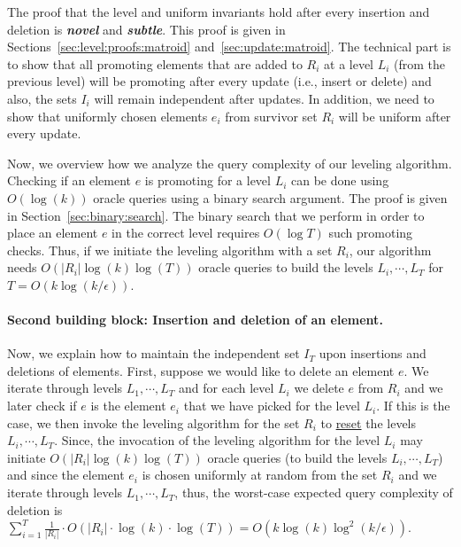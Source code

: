 \documentclass[11pt]{article}
\newcommand{\mO}{O}
\begin{document}
The proof that the level and uniform invariants hold after every insertion and deletion 
is \textbf{\textit{novel}} and \textbf{\textit{subtle}}. 
This proof is given in Sections~\ref{sec:level:proofs:matroid} and~\ref{sec:update:matroid}. 
The technical part is to show that all promoting elements that are added to $R_i$ at a level $L_i$ (from the previous level) 
will be promoting after every update (i.e., insert or delete) and also, the sets $I_i$ will remain independent after updates. 
In addition, we need to show that uniformly chosen elements $e_i$ from survivor set $R_i$ 
will be uniform after every update. 

Now, we overview how we analyze the query complexity of our leveling algorithm.
Checking if an element $e$ is promoting for a level $L_{i}$ 
can be done using $O(\log(k))$ oracle queries using a binary search argument.
The proof is given in Section~\ref{sec:binary:search}.
The binary search that we perform in order to
place an element $e$ in the correct level requires $O(\log T)$ such promoting checks.
Thus, if we initiate the leveling algorithm with a set $R_i$, 
our algorithm needs $O(|R_i| \log(k) \log(T))$ oracle queries to build the levels $L_i,\cdots, L_T$ 
for $T=O(k\log(k/\epsilon))$. 




\paragraph{Second building block: Insertion and deletion of an element.}
Now, we explain how to maintain the independent set $I_T$ upon insertions and deletions of elements. 
First, suppose we would like to delete an element $e$.
We iterate through levels $L_1,\cdots,L_T$ and 
for each level $L_i$ we delete $e$ from $R_i$ and we later check if $e$ is the element $e_i$ that we have picked for the level $L_i$. 
If this is the case, we then 
invoke the leveling algorithm for the set $R_i$ to \underline{reset} 
the levels $L_i,\cdots, L_T$. 
Since, the invocation of the leveling algorithm for the level $L_i$
may initiate $O(|R_i| \log(k) \log(T))$ oracle queries 
(to build the levels $L_i,\cdots, L_T$) and 
since the element $e_i$ is chosen uniformly at random from the set $R_i$ and 
we iterate through levels $L_1,\cdots,L_T$, thus, 
the worst-case expected query complexity of deletion is 
$\sum_{i=1}^T \frac{1}{|R_i|} \cdot \mO( |R_i|\cdot \log(k) \cdot \log(T)) = \mO(k\log(k)\log^2(k/\epsilon))$.
\end{document}

